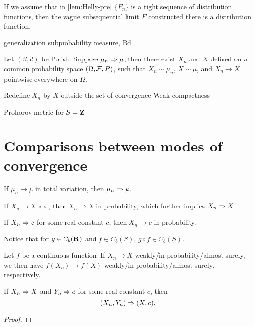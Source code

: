 \begin{namedthm}
    If we assume that in \cref{lem:Helly-pre} $\{F_n\}$ is a tight sequence of distribution functions, then the vague subsequential limit $F$ constructed there is a distribution function.
\end{namedthm}

generalization subprobability measure, Rd

\begin{namedthm}
    Let $(S,d)$ be Polish. Suppose $\mu_n \Rightarrow \mu$, then there exist $X_n$ and $X$ defined on a common probability space $(\Omega,\mathcal{F},P)$, such that $X_n \sim \mu_n$, $X\sim \mu$, and $X_n \to X$ pointwise everywhere on $\Omega$.
\end{namedthm}

Redefine $X_n$ by $X$ outside the set of convergence
Weak compactness

Prohorov metric for $S = \mathbf{Z}$


\section{Comparisons between modes of convergence}
\begin{thm}
    If $\mu_n \to \mu$ in total variation, then $\mu_n \Rightarrow \mu$.
\end{thm}

\begin{thm}
    If $X_n \to X$ a.s., then $X_n \to X$ in probability, which further implies $X_n \Rightarrow X$.
\end{thm}

\begin{thm}
    If $X_n \Rightarrow c$ for some real constant $c$, then $X_n \to c$ in probability.
\end{thm}

Notice that for $g \in C_b(\mathbf{R})$ and $f \in C_b(S)$, $g\circ f\in C_b(S)$.

\begin{namedthm} Let $f$ be a continuous function. If $X_n \to X$ weakly/in probability/almost surely, we then have $f(X_n) \to f(X)$ weakly/in probability/almost surely, respectively.
\end{namedthm}

\begin{lem}
    If $X_n \Rightarrow X$ and $Y_n \Rightarrow c$ for some real constant $c$, then \[
        (X_n,Y_n) \Rightarrow (X,c).
    \]
\end{lem}
\begin{proof}
    
\end{proof}

